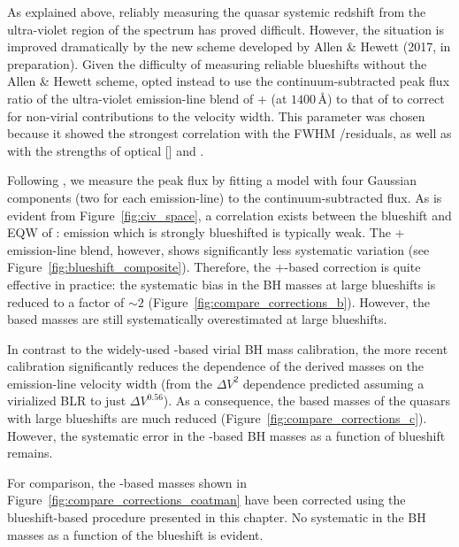 As explained above, reliably measuring the quasar systemic redshift from the ultra-violet region of the spectrum has proved difficult. 
However, the situation is improved dramatically by the new scheme developed by Allen \& Hewett (2017, in preparation). 
Given the difficulty of measuring reliable  blueshifts without the Allen \& Hewett scheme, \citet{runnoe13} opted instead to use the continuum-subtracted peak flux ratio of the ultra-violet emission-line blend of + (at $1400$\,\AA) to that of  to correct for non-virial contributions to the  velocity width. 
This parameter was chosen because it showed the strongest correlation with the FWHM /\hb residuals, as well as with the strengths of optical [] and . 

Following \citet{runnoe13}, we measure the peak flux by fitting a model with four Gaussian components (two for each emission-line) to the continuum-subtracted flux.
As is evident from Figure~\ref{fig:civ_space}, a correlation exists between the blueshift and EQW of :  emission which is strongly blueshifted is typically weak. 
The + emission-line blend, however, shows significantly less systematic variation (see Figure~\ref{fig:blueshift_composite}). 
Therefore, the +-based correction is quite effective in practice: the systematic bias in the  BH masses at large  blueshifts is reduced to a factor of $\sim2$ (Figure~\ref{fig:compare_corrections_b}).
However, the  based masses are still systematically overestimated at large  blueshifts. 

In contrast to the widely-used \citet{vestergaard06} -based virial BH mass calibration, the more recent \citet{park13} calibration significantly reduces the dependence of the derived masses on the emission-line velocity width (from the $\Delta V^2$ dependence predicted assuming a virialized BLR to just $\Delta V^{0.56}$).
As a consequence, the  based masses of the quasars with large  blueshifts are much reduced (Figure~\ref{fig:compare_corrections_c}).
However, the systematic error in the -based BH masses as a function of  blueshift remains. 

For comparison, the -based masses shown in Figure~\ref{fig:compare_corrections_coatman} have been corrected using the  blueshift-based procedure presented in this chapter. 
No systematic in the BH masses as a function of the  blueshift is evident. 

